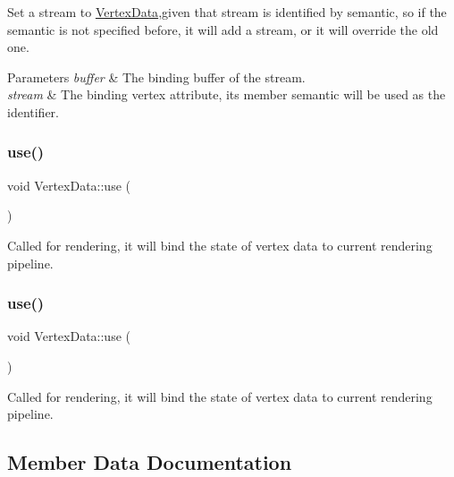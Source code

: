 Set a stream to \hyperlink{classVertexData}{Vertex\+Data},given that stream is identified by semantic, so if the semantic is not specified before, it will add a stream, or it will override the old one. 
\begin{DoxyParams}{Parameters}
{\em buffer} & The binding buffer of the stream. \\
\hline
{\em stream} & The binding vertex attribute, its member semantic will be used as the identifier. \\
\hline
\end{DoxyParams}
\mbox{\label{classVertexData_a441995cde63c9a71140645667632bc3d}} 
\subsubsection{\texorpdfstring{use()}{use()}\hspace{0.1cm}{\footnotesize\ttfamily [1/2]}}
{\footnotesize\ttfamily void Vertex\+Data\+::use (\begin{DoxyParamCaption}{ }\end{DoxyParamCaption})}

Called for rendering, it will bind the state of vertex data to current rendering pipeline. \mbox{\label{classVertexData_a441995cde63c9a71140645667632bc3d}} 
\subsubsection{\texorpdfstring{use()}{use()}\hspace{0.1cm}{\footnotesize\ttfamily [2/2]}}
{\footnotesize\ttfamily void Vertex\+Data\+::use (\begin{DoxyParamCaption}{ }\end{DoxyParamCaption})}

Called for rendering, it will bind the state of vertex data to current rendering pipeline. 

\subsection{Member Data Documentation}
\mbox{\label{classVertexData_ade96e434961d895eb540ffb4547c5e32}} 

